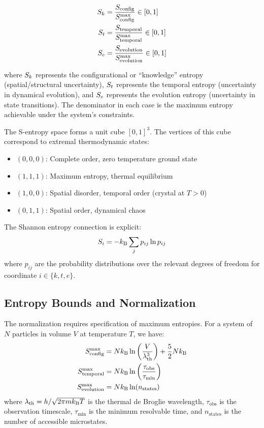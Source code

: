\begin{align}
S_k &= \frac{S_{\text{config}}}{S_{\text{config}}^{\max}} \in [0,1] \label{eq:Sk}\\
S_t &= \frac{S_{\text{temporal}}}{S_{\text{temporal}}^{\max}} \in [0,1] \label{eq:St}\\
S_e &= \frac{S_{\text{evolution}}}{S_{\text{evolution}}^{\max}} \in [0,1] \label{eq:Se}
\end{align}

\noindent where $S_k$ represents the configurational or ``knowledge'' entropy (spatial/structural uncertainty), $S_t$ represents the temporal entropy (uncertainty in dynamical evolution), and $S_e$ represents the evolution entropy (uncertainty in state transitions). The denominator in each case is the maximum entropy achievable under the system's constraints.

The S-entropy space forms a unit cube $[0,1]^3$. The vertices of this cube correspond to extremal thermodynamic states:
\begin{itemize}
    \item $(0,0,0)$: Complete order, zero temperature ground state
    \item $(1,1,1)$: Maximum entropy, thermal equilibrium
    \item $(1,0,0)$: Spatial disorder, temporal order (crystal at $T>0$)
    \item $(0,1,1)$: Spatial order, dynamical chaos
\end{itemize}

The Shannon entropy connection \cite{shannon1948mathematical, cover2006elements} is explicit:
\begin{equation}
S_i = -k_{\mathrm{B}} \sum_j p_{ij} \ln p_{ij}
\end{equation}
where $p_{ij}$ are the probability distributions over the relevant degrees of freedom for coordinate $i \in \{k, t, e\}$.

\subsection{Entropy Bounds and Normalization}

The normalization requires specification of maximum entropies. For a system of $N$ particles in volume $V$ at temperature $T$, we have:
\begin{align}
S_{\text{config}}^{\max} &= Nk_{\mathrm{B}} \ln\left(\frac{V}{\lambda_{\text{th}}^3}\right) + \frac{5}{2}Nk_{\mathrm{B}} \\
S_{\text{temporal}}^{\max} &= Nk_{\mathrm{B}} \ln\left(\frac{\tau_{\text{obs}}}{\tau_{\text{min}}}\right) \\
S_{\text{evolution}}^{\max} &= Nk_{\mathrm{B}} \ln(n_{\text{states}})
\end{align}
where $\lambda_{\text{th}} = h/\sqrt{2\pi m k_{\mathrm{B}} T}$ is the thermal de Broglie wavelength, $\tau_{\text{obs}}$ is the observation timescale, $\tau_{\text{min}}$ is the minimum resolvable time, and $n_{\text{states}}$ is the number of accessible microstates.

